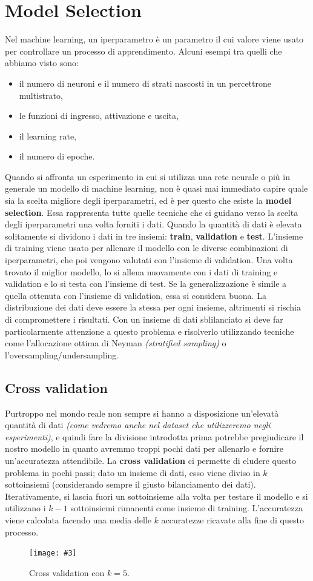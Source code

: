 \documentclass[12pt, twoside, letterpaper]{report}
\newcommand{\img}[4] {
	\begin{figure}
		\centering
		\texttt{[image: \#3]}\\
		\caption{#1}
		\label{#4}
	\end{figure}
}
\begin{document}
		\section{Model Selection} 
			Nel machine learning, un iperparametro è un parametro il cui valore viene usato per controllare un processo di apprendimento. Alcuni esempi tra quelli che abbiamo visto sono: 
			\begin{itemize}
				\item il numero di neuroni e il numero di strati nascosti in un percettrone multistrato,
				\item le funzioni di ingresso, attivazione e uscita, 
				\item il learning rate,
				\item il numero di epoche.
			\end{itemize}
			Quando si affronta un esperimento in cui si utilizza una rete neurale o più in generale un modello di machine learning, non è quasi mai immediato capire quale sia la scelta migliore degli iperparametri, ed è per questo che esiste la \textbf{model selection}. Essa rappresenta tutte quelle tecniche che ci guidano verso la scelta degli iperparametri una volta forniti i dati. Quando la quantità di dati è elevata solitamente si dividono i dati in tre insiemi: \textbf{train}, \textbf{validation} e \textbf{test}. L'insieme di training viene usato per allenare il modello con le diverse combinazioni di iperparametri, che poi vengono valutati con l'insieme di validation. Una volta trovato il miglior modello, lo si allena nuovamente con i dati di training e validation e lo si testa con l'insieme di test. Se la generalizzazione è simile a quella ottenuta con l'insieme di validation, essa si considera buona. La distribuzione dei dati deve essere la stessa per ogni insieme, altrimenti si rischia di compromettere i risultati. Con un insieme di dati sblilanciato si deve far particolarmente attenzione a questo problema e risolverlo utilizzando tecniche come l'allocazione ottima di Neyman \textit{(stratified sampling)} o l'oversampling/undersampling. 
			
			\subsection{Cross validation}
				Purtroppo nel mondo reale non sempre si hanno a disposizione un'elevatà quantità di dati \textit{(come vedremo anche nel dataset che utilizzeremo negli esperimenti)}, e quindi fare la divisione introdotta prima potrebbe pregiudicare il nostro modello in quanto avremmo troppi pochi dati per allenarlo e fornire un'accuratezza attendibile. La \textbf{cross validation} ci permette di eludere questo problema in pochi passi; dato un insieme di dati, esso viene diviso in $k$ sottoinsiemi (considerando sempre il giusto bilanciamento dei dati). Iterativamente, si lascia fuori un sottoinsieme alla volta per testare il modello e si utilizzano i $k-1$ sottoinsiemi rimanenti come insieme di training. L'accuratezza viene calcolata facendo una media delle $k$ accuratezze ricavate alla fine di questo processo. 
				\img{Cross validation con $k = 5$.}{0.5}{cv.png}{cv}
				
\end{document}
